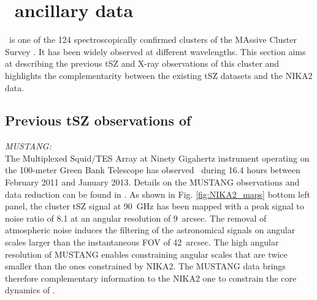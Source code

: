 \documentclass[traditabstract]{aa}
\begin{document}

\section{\psz\ ancillary data}\label{sec:ancillary}

\psz\ is one of the 124 spectroscopically confirmed clusters of the MAssive Cluster Survey \citep[MACS,][]{ebe01}. It has been widely observed at different wavelengths. This section aims at describing the previous tSZ and X-ray observations of this cluster and highlights the complementarity between the existing tSZ datasets and the NIKA2 data.

\subsection{Previous tSZ observations of \psz}\label{sec:previous_sz}
\emph{MUSTANG:}\\
The Multiplexed Squid/TES Array at Ninety Gigahertz \citep[MUSTANG, ][]{dic08} instrument operating on the 100-meter Green Bank Telescope has observed \psz\ during 16.4 hours between February 2011 and January 2013. Details on the MUSTANG observations and data reduction can be found in \cite{mas10,kor11}. As shown in Fig. \ref{fig:NIKA2_maps} bottom left panel, the cluster tSZ signal at 90~GHz has been mapped with a peak signal to noise ratio of 8.1 at an angular resolution of 9~arcsec. The removal of atmospheric noise induces the filtering of the astronomical signals on angular scales larger than the instantaneous FOV of 42~arcsec. The high angular resolution of MUSTANG enables constraining angular scales that are twice smaller than the ones constrained by NIKA2. The MUSTANG data brings therefore complementary information to the NIKA2 one to constrain the core dynamics of \psz.\\
\end{document}
